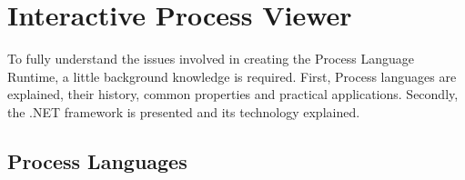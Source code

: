 \chapter{Interactive Process Viewer}

	To fully understand the issues involved in creating the Process Language 
	Runtime, a little background knowledge is required. First, Process 
	languages are explained, their history, common properties and practical 
	applications. Secondly, the .NET framework is presented and its technology
	explained.

\section{Process Languages}

